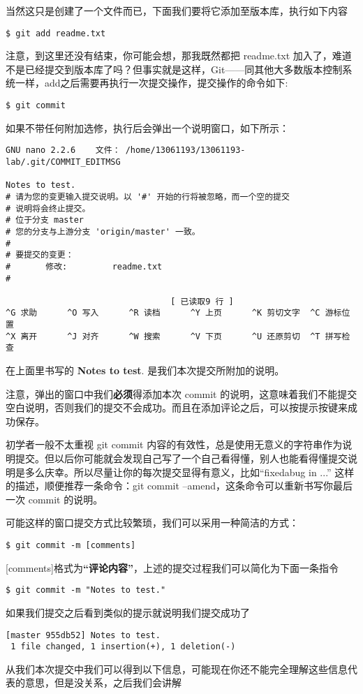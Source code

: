 当然这只是创建了一个文件而已，下面我们要将它添加至版本库，执行如下内容
\begin{verbatim}
$ git add readme.txt
\end{verbatim}
注意，到这里还没有结束，你可能会想，那我既然都把 readme.txt 加入了，难道不是已经提交到版本库了吗？但事实就是这样，Git——同其他大多数版本控制系统一样，add之后需要再执行一次提交操作，提交操作的命令如下:
\begin{verbatim}
$ git commit
\end{verbatim}
如果不带任何附加选修，执行后会弹出一个说明窗口，如下所示：
\begin{verbatim}
GNU nano 2.2.6    文件： /home/13061193/13061193-lab/.git/COMMIT_EDITMSG

Notes to test.
# 请为您的变更输入提交说明。以 '#' 开始的行将被忽略，而一个空的提交
# 说明将会终止提交。
# 位于分支 master
# 您的分支与上游分支 'origin/master' 一致。
#
# 要提交的变更：
#       修改:         readme.txt
#

                                 [ 已读取9 行 ]
^G 求助      ^O 写入      ^R 读档      ^Y 上页      ^K 剪切文字  ^C 游标位置
^X 离开      ^J 对齐      ^W 搜索      ^V 下页      ^U 还原剪切  ^T 拼写检查
\end{verbatim}
在上面里书写的 \textbf{Notes to test}. 是我们本次提交所附加的说明。

注意，弹出的窗口中我们\textbf{必须}得添加本次 commit 的说明，这意味着我们不能提交空白说明，否则我们的提交不会成功。而且在添加评论之后，可以按提示按键来成功保存。

\begin{note}
初学者一般不太重视 git commit 内容的有效性，总是使用无意义的字符串作为说明提交。但以后你可能就会发现自己写了一个自己看得懂，别人也能看得懂提交说明是多么庆幸。所以尽量让你的每次提交显得有意义，比如“fixedabug in ...” 这样的描述，顺便推荐一条命令：git commit --amend，这条命令可以重新书写你最后一次 commit 的说明。
\end{note}

可能这样的窗口提交方式比较繁琐，我们可以采用一种简洁的方式：
\begin{verbatim}
$ git commit -m [comments]
\end{verbatim}
[comments]格式为\textbf{“评论内容”}，上述的提交过程我们可以简化为下面一条指令
\begin{verbatim}
$ git commit -m "Notes to test."
\end{verbatim}
如果我们提交之后看到类似的提示就说明我们提交成功了
\begin{verbatim}
[master 955db52] Notes to test.
 1 file changed, 1 insertion(+), 1 deletion(-)
\end{verbatim}
从我们本次提交中我们可以得到以下信息，可能现在你还不能完全理解这些信息代表的意思，但是没关系，之后我们会讲解

